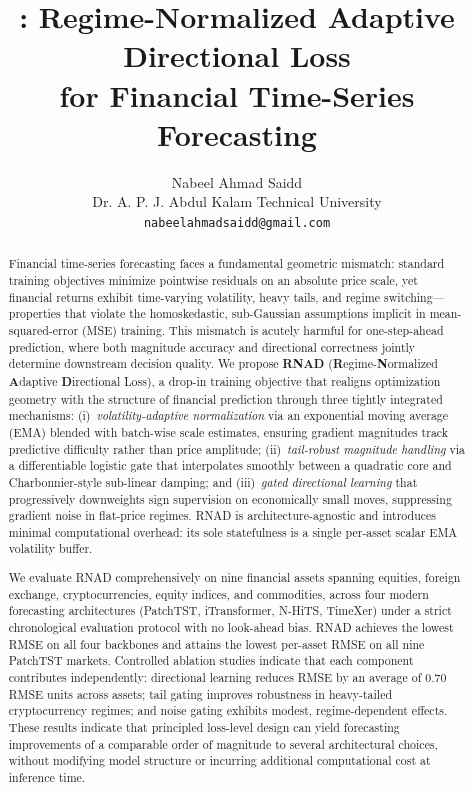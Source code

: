 \documentclass[11pt]{article}
\title{\RNAD: Regime-Normalized Adaptive Directional Loss\\
       for Financial Time-Series Forecasting}
\author{Nabeel Ahmad Saidd\\
Dr. A. P. J. Abdul Kalam Technical University\\
\texttt{nabeelahmadsaidd@gmail.com}}
\date{}
\newcommand{\RNAD}{RNAD\xspace}
\begin{document}
\maketitle

\begin{abstract}
Financial time-series forecasting faces a fundamental geometric
mismatch: standard training objectives minimize pointwise residuals on
an absolute price scale, yet financial returns exhibit time-varying
volatility, heavy tails, and regime switching---properties that
violate the homoskedastic, sub-Gaussian assumptions implicit in
mean-squared-error (MSE) training. This mismatch is acutely harmful
for one-step-ahead prediction, where both magnitude accuracy and
directional correctness jointly determine downstream decision quality.
We propose \textbf{\RNAD} (\textbf{R}egime-\textbf{N}ormalized
\textbf{A}daptive \textbf{D}irectional Loss), a drop-in training
objective that realigns optimization geometry with the structure of
financial prediction through three tightly integrated mechanisms:
(i)~\emph{volatility-adaptive normalization} via an exponential
moving average (EMA) blended with batch-wise scale estimates, ensuring
gradient magnitudes track predictive difficulty rather than price
amplitude; (ii)~\emph{tail-robust magnitude handling} via a
differentiable logistic gate that interpolates smoothly between a
quadratic core and Charbonnier-style sub-linear damping; and
(iii)~\emph{gated directional learning} that progressively downweights
sign supervision on economically small moves, suppressing gradient
noise in flat-price regimes. \RNAD is architecture-agnostic
and introduces minimal computational overhead: its sole statefulness
is a single per-asset scalar EMA volatility buffer.

We evaluate \RNAD comprehensively on nine financial assets spanning
equities, foreign exchange, cryptocurrencies, equity indices, and
commodities, across four modern forecasting architectures
(PatchTST, iTransformer, N-HiTS, TimeXer) under a strict
chronological evaluation protocol with no look-ahead bias. \RNAD
achieves the lowest RMSE on all four backbones and attains
the lowest per-asset RMSE on all nine PatchTST markets.
Controlled ablation studies indicate that each component contributes
independently: directional learning reduces RMSE by an average of
$0.70$ RMSE units across assets; tail gating improves robustness in
heavy-tailed cryptocurrency regimes; and noise gating exhibits modest,
regime-dependent effects. These results indicate
that principled loss-level design can yield forecasting improvements
of a comparable order of magnitude to several architectural choices,
without modifying model structure or incurring additional computational
cost at inference time.
\end{abstract}
\end{document}
